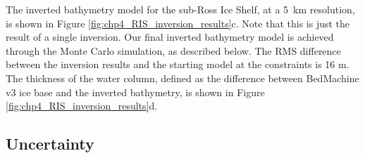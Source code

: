 The inverted bathymetry model for the sub-Ross Ice Shelf, at a 5~km resolution, is shown in Figure \ref{fig:chp4_RIS_inversion_results}c. Note that this is just the result of a single inversion. Our final inverted bathymetry model is achieved through the Monte Carlo simulation, as described below. The RMS difference between the inversion results and the starting model at the constraints is 16 m. The thickness of the water column, defined as the difference between BedMachine v3 ice base and the inverted bathymetry, is shown in Figure \ref{fig:chp4_RIS_inversion_results}d. \\

\subsection{Uncertainty}

